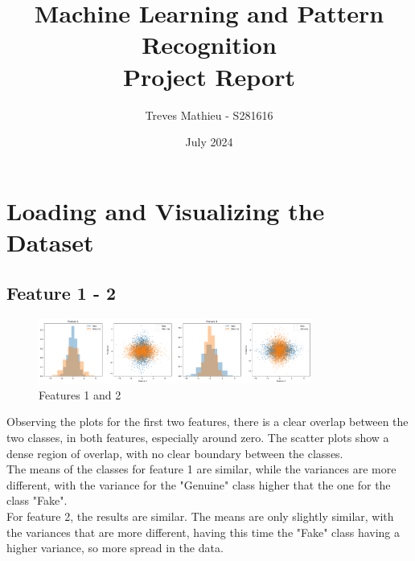 \documentclass[12pt, a4paper]{article}
\begin{document}
\title{%
	Machine Learning and Pattern Recognition \\
	\large Project Report}

\author{Treves Mathieu - S281616}
\date{July 2024}

\maketitle


\vspace{20 mm}

\tableofcontents
\clearpage

\section{Loading and Visualizing the Dataset}
\subsection{Feature 1 - 2}

\begin{figure}[ht]
	\centering
	\includegraphics[width=0.8\textwidth]{features_1_2}
	\caption{Features 1 and 2}
	\label{fig:features1_2}
\end{figure}

Observing the plots for the first two features, there is a clear overlap between the two classes, in both features, especially around zero. The scatter plots show a dense region of overlap, with no clear boundary between the classes.\\
The means of the classes for feature 1 are similar, while the variances are more different, with the variance for the "Genuine" class higher that the one for the class "Fake".\\
For feature 2, the results are similar. The means are only slightly similar, with the variances that are more different, having this time the "Fake" class having a higher variance, so more spread in the data.
\end{document}

